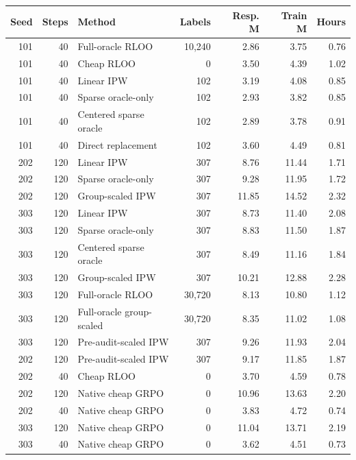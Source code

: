 \begin{tabular}{rrlrrrr}
\toprule
Seed & Steps & Method & Labels & Resp. M & Train M & Hours \\
\midrule
101 & 40 & Full-oracle RLOO & 10,240 & 2.86 & 3.75 & 0.76 \\
101 & 40 & Cheap RLOO & 0 & 3.50 & 4.39 & 1.02 \\
101 & 40 & Linear IPW & 102 & 3.19 & 4.08 & 0.85 \\
101 & 40 & Sparse oracle-only & 102 & 2.93 & 3.82 & 0.85 \\
101 & 40 & Centered sparse oracle & 102 & 2.89 & 3.78 & 0.91 \\
101 & 40 & Direct replacement & 102 & 3.60 & 4.49 & 0.81 \\
202 & 120 & Linear IPW & 307 & 8.76 & 11.44 & 1.71 \\
202 & 120 & Sparse oracle-only & 307 & 9.28 & 11.95 & 1.72 \\
202 & 120 & Group-scaled IPW & 307 & 11.85 & 14.52 & 2.32 \\
303 & 120 & Linear IPW & 307 & 8.73 & 11.40 & 2.08 \\
303 & 120 & Sparse oracle-only & 307 & 8.83 & 11.50 & 1.87 \\
303 & 120 & Centered sparse oracle & 307 & 8.49 & 11.16 & 1.84 \\
303 & 120 & Group-scaled IPW & 307 & 10.21 & 12.88 & 2.28 \\
303 & 120 & Full-oracle RLOO & 30,720 & 8.13 & 10.80 & 1.12 \\
303 & 120 & Full-oracle group-scaled & 30,720 & 8.35 & 11.02 & 1.08 \\
303 & 120 & Pre-audit-scaled IPW & 307 & 9.26 & 11.93 & 2.04 \\
202 & 120 & Pre-audit-scaled IPW & 307 & 9.17 & 11.85 & 1.87 \\
202 & 40 & Cheap RLOO & 0 & 3.70 & 4.59 & 0.78 \\
202 & 120 & Native cheap GRPO & 0 & 10.96 & 13.63 & 2.20 \\
202 & 40 & Native cheap GRPO & 0 & 3.83 & 4.72 & 0.74 \\
303 & 120 & Native cheap GRPO & 0 & 11.04 & 13.71 & 2.19 \\
303 & 40 & Native cheap GRPO & 0 & 3.62 & 4.51 & 0.73 \\
\bottomrule
\end{tabular}
